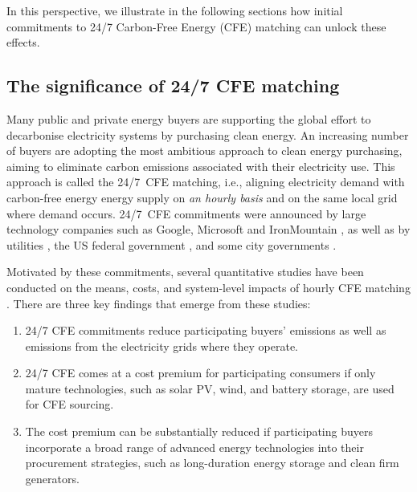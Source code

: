 \documentclass[pdflatex,sn-basic, Numbered]{sn-jnl}
\theoremstyle{thmstyleone}%
\theoremstyle{thmstyletwo}%
\theoremstyle{thmstylethree}%
\begin{document}
In this perspective, we illustrate in the following sections how initial commitments to 24/7 Carbon-Free Energy (CFE) matching can unlock these effects.

\subsection*{The significance of 24/7 CFE matching}\label{sec2}

Many public and private energy buyers are supporting the global effort to decarbonise electricity systems by purchasing clean energy.
An increasing number of buyers are adopting the most ambitious approach to clean energy purchasing, aiming to eliminate carbon emissions associated with their electricity use.
This approach is called the 24/7~CFE matching, i.e., aligning electricity demand with carbon-free energy energy supply on \textit{an hourly basis} and on the same local grid where demand occurs.
24/7~CFE commitments were announced by large technology companies such as Google, Microsoft and IronMountain \cite{google-247by2030, Microsoft-vision, IronMountainSustainability}, as well as by utilities \cite{peninsula-OurPathto247}, the US federal government \cite{thewhitehouseExecutiveOrderCatalyzing2021}, and some city governments \cite{iowaenvcouncil-247}.

Motivated by these commitments, several quantitative studies have been conducted on the means, costs, and system-level impacts of hourly CFE matching \cite{xu-247CFE-report, ieaAdvancingDecarbonisationClean2022, riepin-zenodo-systemlevel247, riepinMeansCostsSystemlevel2024}. There are three key findings that emerge from these studies:
\begin{enumerate}
    \item 24/7 CFE commitments reduce participating buyers' emissions as well as emissions from the electricity grids where they operate.
    \item 24/7 CFE comes at a cost premium for participating consumers if only mature technologies, such as solar PV, wind, and battery storage, are used for CFE sourcing.
    \item The cost premium can be substantially reduced if participating buyers incorporate a broad range of advanced energy technologies into their procurement strategies, such as long-duration energy storage and clean firm generators.
\end{enumerate}
\end{document}
